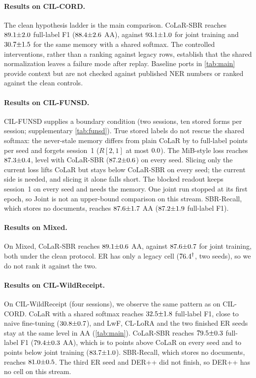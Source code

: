 \documentclass[10pt,twocolumn,letterpaper]{article}
\begin{document}
\paragraph{Results on CIL-CORD.} The clean hypothesis ladder is the main comparison. CoLaR-SBR reaches $89.1{\pm}2.0$ full-label F1 ($88.4{\pm}2.6$ AA), against $93.1{\pm}1.0$ for joint training and $30.7{\pm}1.5$ for the same memory with a shared softmax. The controlled interventions, rather than a ranking against legacy rows, establish that the shared normalization leaves a failure mode after replay. Baseline ports in \cref{tab:main} provide context but are not checked against published NER numbers or ranked against the clean controls.

\paragraph{Results on CIL-FUNSD.} CIL-FUNSD supplies a boundary condition (two sessions, ten stored forms per session; supplementary \cref{tab:funsd}). True stored labels do not rescue the shared softmax: the never-stale memory differs from plain CoLaR by \nFunsdOracleMinusColarFullMin{} to \nFunsdOracleMinusColarFullMax{} full-label points per seed and forgets session~1 ($R[2,1]$ at most $0.0$). The MiB-style loss reaches $87.3{\pm}0.4$, level with CoLaR-SBR ($87.2{\pm}0.6$) on every seed. Slicing only the current loss lifts CoLaR but stays below CoLaR-SBR on every seed; the current side is needed, and slicing it alone falls short. The blocked readout keeps session~1 on every seed and needs the memory. One joint run stopped at its first epoch, so Joint is not an upper-bound comparison on this stream. SBR-Recall, which stores no documents, reaches $87.6{\pm}1.7$ AA ($87.2{\pm}1.9$ full-label F1).

\paragraph{Results on Mixed.} On Mixed, CoLaR-SBR reaches $89.1{\pm}0.6$ AA, against $87.6{\pm}0.7$ for joint training, both under the clean protocol. ER has only a legacy cell ($76.4^\dagger$, two seeds), so we do not rank it against the two.

\paragraph{Results on CIL-WildReceipt.} On CIL-WildReceipt (four sessions), we observe the same pattern as on CIL-CORD. CoLaR with a shared softmax reaches $32.5{\pm}1.8$ full-label F1, close to naive fine-tuning ($30.8{\pm}0.7$), and LwF, CL-LoRA and the two finished ER seeds stay at the same level in AA (\cref{tab:main}). CoLaR-SBR reaches $79.5{\pm}0.3$ full-label F1 ($79.4{\pm}0.3$ AA), which is \nWildSbrMinusColarFullMin{} to \nWildSbrMinusColarFullMax{} points above CoLaR on every seed and \nWildJointMinusSbrFullMin{} to \nWildJointMinusSbrFullMax{} points below joint training ($83.7{\pm}1.0$). SBR-Recall, which stores no documents, reaches $81.0{\pm}0.5$. The third ER seed and DER++ did not finish, so DER++ has no cell on this stream.
\end{document}
